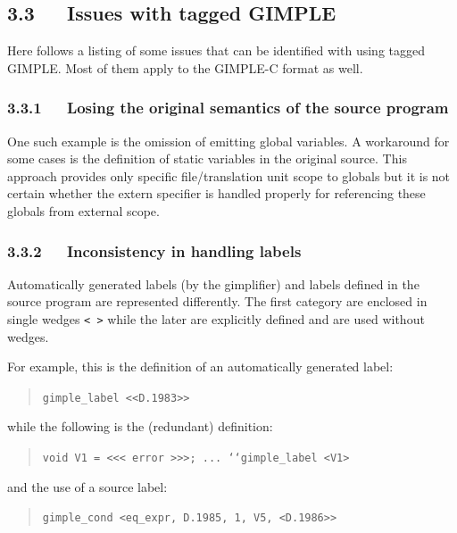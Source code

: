 \documentclass[a4paper]{article}
\begin{document}
\subsection{3.3~~~Issues with tagged GIMPLE%
  \label{issues-with-tagged-gimple}%
}

Here follows a listing of some issues that can be identified with using tagged
GIMPLE. Most of them apply to the GIMPLE-C format as well.


\subsubsection{3.3.1~~~Losing the original semantics of the source program%
  \label{losing-the-original-semantics-of-the-source-program}%
}

One such example is the omission of emitting global variables. A workaround
for some cases is the definition of static variables in the original source.
This approach provides only specific file/translation unit scope to globals
but it is not certain whether the extern specifier is handled properly for
referencing these globals from external scope.


\subsubsection{3.3.2~~~Inconsistency in handling labels%
  \label{inconsistency-in-handling-labels}%
}

Automatically generated labels (by the gimplifier) and labels defined in the
source program are represented differently. The first category are enclosed
in single wedges \texttt{< >} while the later are explicitly defined and are
used without wedges.

For example, this is the definition of an automatically generated label:
%
\begin{quote}

\texttt{gimple\_label <{}<D.1983>{}>}

\end{quote}

while the following is the (redundant) definition:
%
\begin{quote}

\texttt{void V1 = <{}<{}< error >{}>{}>;
...
`{}`gimple\_label <V1>}

\end{quote}

and the use of a source label:
%
\begin{quote}

\texttt{gimple\_cond <eq\_expr, D.1985, 1, V5, <D.1986>{}>}

\end{quote}
\end{document}

